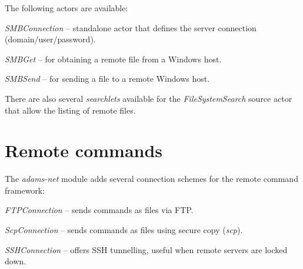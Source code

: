 \documentclass[a4paper]{book}
\begin{document}
The following actors are available:
\begin{tight_itemize}
	\item \textit{SMBConnection} -- standalone actor that defines the server
	connection (domain/user/password).
	\item \textit{SMBGet} -- for obtaining a remote file from a Windows host.
	\item \textit{SMBSend} -- for sending a file to a remote Windows host.
\end{tight_itemize}

There are also several \textit{searchlets} available for the
\textit{FileSystemSearch} source actor that allow the listing of remote
files.


\chapter{Remote commands}

The \textit{adams-net} module adds several connection schemes for the
remote command framework:

\begin{tight_itemize}
	\item \textit{FTPConnection} -- sends commands as files via FTP.
	\item \textit{ScpConnection} -- sends commands as files using secure
	copy (\textit{scp}).
	\item \textit{SSHConnection} -- offers SSH tunnelling, useful when
	remote servers are locked down.
\end{tight_itemize}


\end{document}
